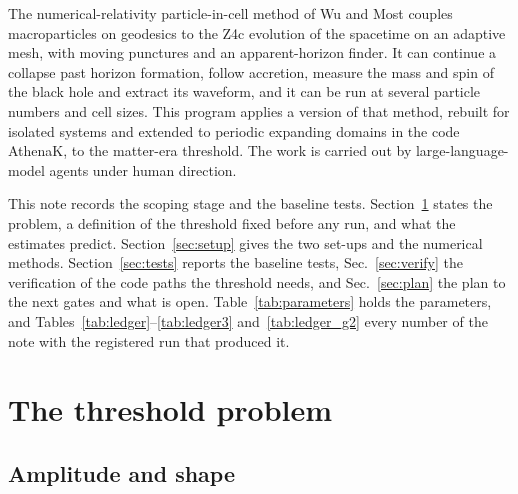 \documentclass[aps,prd,twocolumn,10pt,superscriptaddress,nofootinbib,longbibliography,floatfix]{revtex4-2}
\begin{document}
The numerical-relativity particle-in-cell method of Wu and Most \cite{Wu:2026nrpic} couples macroparticles on geodesics to the Z4c evolution of the spacetime on an adaptive mesh, with moving punctures and an apparent-horizon finder. It can continue a collapse past horizon formation, follow accretion, measure the mass and spin of the black hole and extract its waveform, and it can be run at several particle numbers and cell sizes. This program applies a version of that method, rebuilt for isolated systems and extended to periodic expanding domains in the code AthenaK, to the matter-era threshold. The work is carried out by large-language-model agents under human direction.

This note records the scoping stage and the baseline tests. Section~\ref{sec:problem} states the problem, a definition of the threshold fixed before any run, and what the estimates predict. Section~\ref{sec:setup} gives the two set-ups and the numerical methods. Section~\ref{sec:tests} reports the baseline tests, Sec.~\ref{sec:verify} the verification of the code paths the threshold needs, and Sec.~\ref{sec:plan} the plan to the next gates and what is open. Table~\ref{tab:parameters} holds the parameters, and Tables~\ref{tab:ledger}--\ref{tab:ledger3} and~\ref{tab:ledger_g2} every number of the note with the registered run that produced it.

\section{The threshold problem}\label{sec:problem}

\subsection{Amplitude and shape}\label{sec:amplitude}
\end{document}
